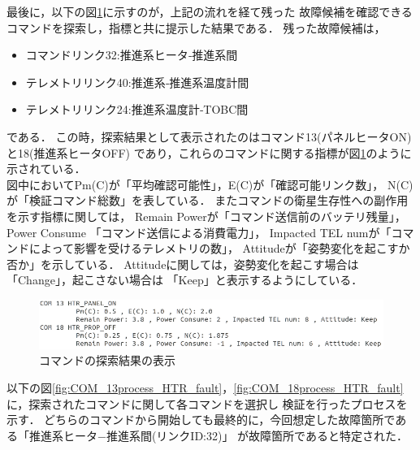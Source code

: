 \documentclass[11pt]{jsreport}
\begin{document}
最後に，以下の図\ref{fig:COM_candidate}に示すのが，上記の流れを経て残った
故障候補を確認できるコマンドを探索し，指標と共に提示した結果である．
残った故障候補は，
\begin{itemize}
   \item コマンドリンク32:推進系ヒータ‐推進系間
   \item テレメトリリンク40:推進系‐推進系温度計間
   \item テレメトリリンク24:推進系温度計‐TOBC間   
\end{itemize}
である．
この時，探索結果として表示されたのはコマンド13(パネルヒータON)と18(推進系ヒータOFF)
であり，これらのコマンドに関する指標が図\ref{fig:COM_candidate}のように示されている．\\
図中においてPm(C)が「平均確認可能性」，E(C)が「確認可能リンク数」，
N(C)が「検証コマンド総数」を表している．
またコマンドの衛星生存性への副作用を示す指標に関しては，
Remain Powerが「コマンド送信前のバッテリ残量」，Power Consume
「コマンド送信による消費電力」，
Impacted TEL numが「コマンドによって影響を受けるテレメトリの数」，
Attitudeが「姿勢変化を起こすか否か」を示している．
Attitudeに関しては，姿勢変化を起こす場合は「Change」，起こさない場合は
「Keep」と表示するようにしている．

\begin{figure}[H]
   \centering
      \includegraphics[width=13.0cm]{figure/COM_candidate.png}
      \caption{コマンドの探索結果の表示}
      \label{fig:COM_candidate}
\end{figure}
以下の図\ref{fig:COM_13process_HTR_fault}，\ref{fig:COM_18process_HTR_fault}
に，探索されたコマンドに関して各コマンドを選択し
検証を行ったプロセスを示す．
どちらのコマンドから開始しても最終的に，今回想定した故障箇所である「推進系ヒータ−推進系間(リンクID:32)」
が故障箇所であると特定された．
\end{document}
